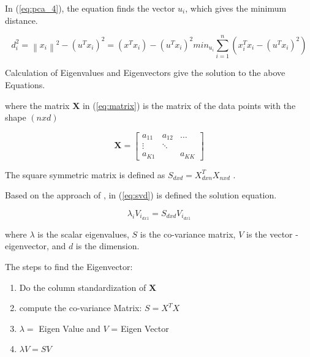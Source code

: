 In (\ref{eq:pca_4}), the equation finds the vector $u_i$, which gives the minimum distance. 

\begin{subequations}
    \label{eq:pca_4}
    \begin{equation}
        d_i^2 = \left \| x_i \right \|^2 - \left ( u^Tx_i \right )^2
    \end{equation}
    \begin{equation}
        = \left ( x^Tx_i \right ) - (u^Tx_i)^2
    \end{equation}
    \begin{equation}
        min_{u_i} \sum_{i=1}^{n}\left ( x_i^Tx_i - \left ( u^Tx_i \right )^2 \right )
    \end{equation}
\end{subequations}

Calculation of Eigenvalues and Eigenvectors give the solution to the above Equations. 

where the matrix $\mathbf{X}$ in (\ref{eq:matrix}) is the matrix of the data points with the shape $(n x d)$

\begin{equation}\label{eq:matrix}
    \mathbf{X} = \begin{bmatrix} 
    a_{11} & a_{12} & \dots \\
    \vdots & \ddots & \\
    a_{K1} &        & a_{KK} 
    \end{bmatrix}
\end{equation}

The square symmetric matrix is defined as $S_{dxd} = X^T_{dxn}X_{nxd}$ \cite{Halko_2011}. 

Based on the approach of \cite{cambridge2009introduction}, in (\ref{eq:svd}) is defined the solution equation.

\begin{equation}
    \label{eq:svd}
    \lambda_i V_{i_{dx1}} = S_{dxd}V_{i_{dx1}}
\end{equation}

where $\lambda$ is the scalar eigenvalues, $S$ is the co-variance matrix, $V$ is the vector - eigenvector, and $d$ is the dimension.

The steps to find the Eigenvector: 

\begin{enumerate}
    \item Do the column standardization of $\mathbf{X}$
    \item compute the co-variance Matrix: $S = X^TX$
    \item $\lambda = $ Eigen Value and $V$ = Eigen Vector
    \item $\lambda V = SV$
\end{enumerate}

